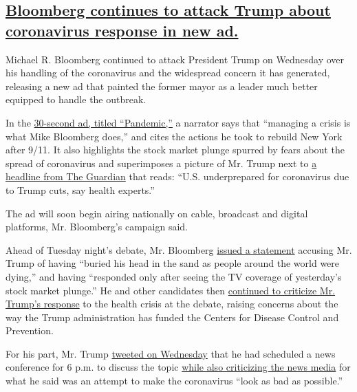 \hypertarget{bloomberg-continues-to-attack-trump-about-coronavirus-response-in-new-ad}{%
\subsection{\texorpdfstring{\protect\hyperlink{bloomberg-continues-to-attack-trump-about-coronavirus-response-in-new-ad}{Bloomberg
continues to attack Trump about coronavirus response in new
ad.}}{Bloomberg continues to attack Trump about coronavirus response in new ad.}}\label{bloomberg-continues-to-attack-trump-about-coronavirus-response-in-new-ad}}

Michael R. Bloomberg continued to attack President Trump on Wednesday
over his handling of the coronavirus and the widespread concern it has
generated, releasing a new ad that painted the former mayor as a leader
much better equipped to handle the outbreak.

In the
\href{https://www.youtube.com/watch?v=gTaE_JlCev8\&feature=youtu.be}{30-second
ad, titled ``Pandemic,''} a narrator says that ``managing a crisis is
what Mike Bloomberg does,'' and cites the actions he took to rebuild New
York after 9/11. It also highlights the stock market plunge spurred by
fears about the spread of coronavirus and superimposes a picture of Mr.
Trump next to
\href{https://www.theguardian.com/world/2020/jan/31/us-coronavirus-budget-cuts-trump-underprepared}{a
headline from The Guardian} that reads: ``U.S. underprepared for
coronavirus due to Trump cuts, say health experts.''

The ad will soon begin airing nationally on cable, broadcast and digital
platforms, Mr. Bloomberg's campaign said.

Ahead of Tuesday night's debate, Mr. Bloomberg
\href{https://www.mikebloomberg.com/news/mike-bloomberg-statement-on-coronavirus-outbreak}{issued
a statement} accusing Mr. Trump of having ``buried his head in the sand
as people around the world were dying,'' and having ``responded only
after seeing the TV coverage of yesterday's stock market plunge.'' He
and other candidates then
\href{https://www.nytimes3xbfgragh.onion/2020/02/25/us/politics/trump-coronavirus.html}{continued
to criticize Mr. Trump's response} to the health crisis at the debate,
raising concerns about the way the Trump administration has funded the
Centers for Disease Control and Prevention.

For his part, Mr. Trump
\href{https://twitter.com/realDonaldTrump/status/1232652371832004608}{tweeted
on Wednesday} that he had scheduled a news conference for 6 p.m. to
discuss the topic
\href{https://www.nytimes3xbfgragh.onion/2020/02/26/us/politics/trump-coronavirus-cdc.html?action=click\&module=Top\%20Stories\&pgtype=Homepage}{while
also criticizing the news media} for what he said was an attempt to make
the coronavirus ``look as bad as possible.''

